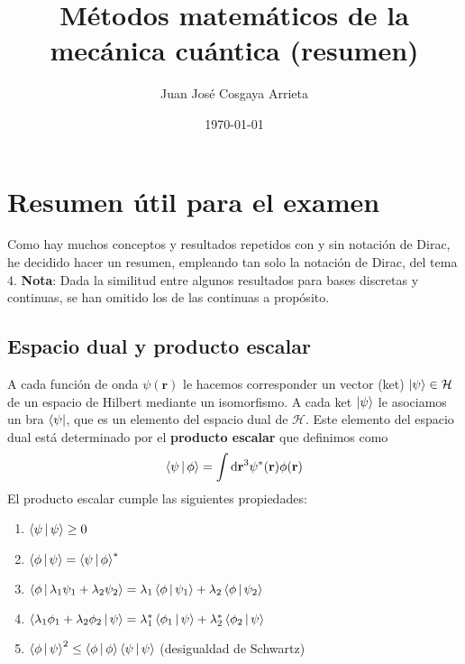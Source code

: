\documentclass[12pt]{report}
\title{Métodos matemáticos de la mecánica cuántica (resumen)}
\author{Juan José Cosgaya Arrieta}
\date{\today}
\begin{document}
\renewcommand{\listtablename}{Índice de tablas}
\renewcommand{\tablename}{Tabla}

\maketitle

\chapter{Resumen útil para el examen}

Como hay muchos conceptos y resultados repetidos con y sin notación de Dirac, he decidido hacer un resumen, empleando tan solo la notación de Dirac, del tema 4. \textbf{Nota}: Dada la similitud entre algunos resultados para bases discretas y continuas, se han omitido los de las continuas a propósito.

\section{Espacio dual y producto escalar}
A cada función de onda $\psi (\textbf{r})$ le hacemos corresponder un vector (ket) $\ket{\psi }\in\mathcal{H}$ de un espacio de Hilbert mediante un isomorfismo. A cada ket  $\ket{\psi }$ le asociamos un bra $\bra{\psi }$, que es un elemento del espacio dual de $\mathcal{H}$. Este elemento del espacio dual está determinado por el \textbf{producto escalar} que definimos como
\begin{equation}
	\Braket{\psi |\phi }=\int\mathrm{d}\textbf{r}^{3}\psi^{\ast}(\textbf{r})\phi (\textbf{r})
\end{equation}
El producto escalar cumple las siguientes propiedades:
\begin{enumerate}
	\item $\Braket{\psi |\psi}\geq 0$
	\item $\Braket{\phi |\psi }=\Braket{\psi |\phi }^{\ast}$
	\item $\Braket{\phi |\lambda_{1}\psi_{1}+\lambda_{2}\psi_{2} }=\lambda_{1}\Braket{\phi |\psi_{1} }+\lambda_{2}\Braket{\phi |\psi_{2}}$
	\item $\Braket{\lambda_{1}\phi_{1}+\lambda_{2}\phi_{2} |\psi }=\lambda_{1}^{\ast}\Braket{\phi_{1} |\psi }+\lambda_{2}^{\ast}\Braket{\phi_{2} |\psi}$
	\item $\Braket{\phi |\psi }^{2}\leq\Braket{\phi |\phi}\Braket{\psi |\psi}$ (desigualdad de Schwartz)
\end{enumerate}
\end{document}
